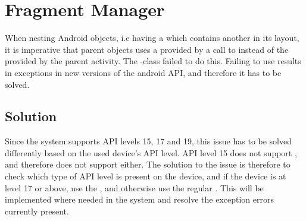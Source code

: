 \section{Fragment Manager}
\label{sec:fragment_manager}

When nesting Android  objects, i.e having a  which contains another  in its layout, it is imperative that parent  objects uses a  provided by a call to  instead of the  provided by the parent activity. The \giraf-class  failed to do this. Failing to use  results in exceptions in new versions of the android API, and therefore it has to be solved. 

\subsection{Solution} 
\label{sub:fragment_manager_solution}
Since the \giraf system supports API levels 15, 17 and 19, this issue has to be solved differently based on the used device's API level. API level 15 does not support , and therefore does not support  either. The solution to the issue is therefore to check which type of API level is present on the device, and if the device is at level 17 or above, use the , and otherwise use the regular . This will be implemented where needed in the \giraf system and resolve the exception errors currently present. 